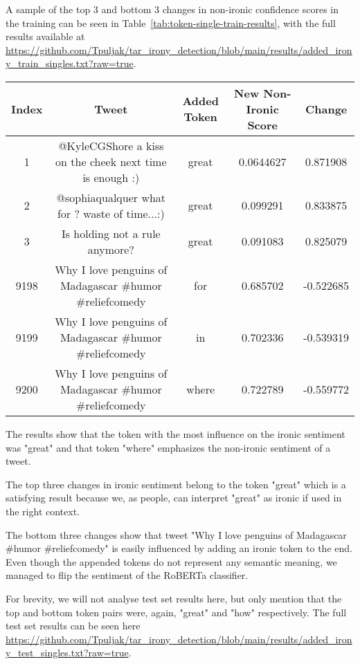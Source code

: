 \documentclass[10pt, a4paper]{article}
\begin{document}
A sample of the top 3 and bottom 3 changes in non-ironic confidence scores in the training can be seen in Table~\ref{tab:token-single-train-results}, with the full results available at \url{https://github.com/Tpuljak/tar_irony_detection/blob/main/results/added_irony_train_singles.txt?raw=true}.

\begin{table*}
\caption{Sample of Single Token Results on the Train Set}
\label{tab:token-single-train-results}
\begin{center}
\begin{tabular}{c|c|c|c|c}
\toprule
Index & Tweet & Added Token & New Non-Ironic Score & Change\\
\midrule
1     & @KyleCGShore a kiss on the cheek next time is enough :)   & great & 0.0644627 & 0.871908 \\
2     & @sophiaqualquer what for ? waste of time...:)             & great & 0.099291  & 0.833875 \\
3     & Is holding not a rule anymore?                            & great & 0.091083  & 0.825079 \\
9198  & Why I love penguins of Madagascar  \#humor \#reliefcomedy & for   & 0.685702  & -0.522685 \\
9199  & Why I love penguins of Madagascar  \#humor \#reliefcomedy & in    & 0.702336  & -0.539319 \\
9200  & Why I love penguins of Madagascar  \#humor \#reliefcomedy & where & 0.722789  & -0.559772 \\
\bottomrule
\end{tabular}
\end{center}
\end{table*}
  
The results show that the token with the most influence on the ironic sentiment was "great" and that token "where" emphasizes the non-ironic sentiment of a tweet.

The top three changes in ironic sentiment belong to the token "great" which is a satisfying result because we, as people, can interpret "great" as ironic if used in the right context.

The bottom three changes show that tweet "Why I love penguins of Madagascar  \#humor \#reliefcomedy" is easily influenced by adding an ironic token to the end.
Even though the appended tokens do not represent any semantic meaning, we managed to flip the sentiment of the RoBERTa classifier.

For brevity, we will not analyse test set results here, but only mention that the top and bottom token pairs were, again, "great" and "how" respectively.
The full test set results can be seen here \url{https://github.com/Tpuljak/tar_irony_detection/blob/main/results/added_irony_test_singles.txt?raw=true}.
\end{document}

